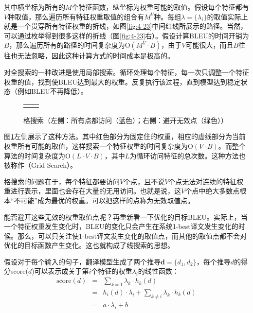 \parinterval 其中横坐标为所有的$M$个特征函数，纵坐标为权重可能的取值。假设每个特征都有$V$种取值，那么遍历所有特征权重取值的组合有$M^V$种。每组$\lambda = \{\lambda_i\}$的取值实际上就是一个贯穿所有特征权重的折线，如图\ref{fig:4-23}中间红线所展示的路径。当然，可以通过枚举得到很多这样的折线（图\ref{fig:4-23}右）。假设计算BLEU的时间开销为$B$，那么遍历所有的路径的时间复杂度为$\textrm{O}(M^V \cdot B)$，由于$V$可能很大，而且$B$往往也无法忽略，因此这种计算方式的时间成本是极高的。

\parinterval 对全搜索的一种改进是使用局部搜索。循环处理每个特征，每一次只调整一个特征权重的值，找到使BLEU达到最大的权重。反复执行该过程，直到模型达到稳定状态（例如BLEU不再降低）。

\begin{figure}[htp]
\centering
\begin{tabular}{l l}
\subfigure{} &  \subfigure{} \\
\end{tabular}
\caption{格搜索（左侧：所有点都访问（蓝色）；右侧：避开无效点（绿色））}
\label{fig:4-24}
\end{figure}

\parinterval 图\ref{fig:4-24}左侧展示了这种方法。其中红色部分为固定住的权重，相应的虚线部分为当前权重所有可能的取值，这样搜索一个特征权重的时间复杂度为$\textrm{O}(V \cdot B)$。而整个算法的时间复杂度为$\textrm{O}(L \cdot V \cdot B)$，其中$L$为循环访问特征的总次数。这种方法也被称作{\small{}}（Grid Search）。

\parinterval 格搜索的问题在于，每个特征都要访问$V$个点，且不说$V$个点无法对连续的特征权重进行表示，里面也会存在大量的无用访问。也就是说，这$V$个点中绝大多数点根本``不可能''成为最优的权重。可以把这样的点称为无效取值点。

\parinterval 能否避开这些无效的权重取值点呢？再重新看一下优化的目标BLEU。实际上，当一个特征权重发生变化时，BLEU的变化只会产生在系统1-best译文发生变化的时候。那么，可以只关注使1-best译文发生变化的取值点，而其他的取值点都不会对优化的目标函数产生变化。这也就构成了线搜索的思想。

\parinterval 假设对于每个输入的句子，翻译模型生成了两个推导$\mathbf{d} = \{d_1,d_2\}$，每个推导$d$的得分score($d$)可以表示成关于第$i$个特征的权重$\lambda_i$的线性函数：
\begin{eqnarray}
\textrm{score}(d) &=& \sum_{k=1} \lambda_k \cdot h_k (d) \nonumber \\
&=& h_i (d) \cdot \lambda_i + \sum_{k \neq i} \lambda_k \cdot h_k (d) \nonumber \\
&=& a \cdot \lambda_i + b
\label{eq:4-20}
\end{eqnarray}

